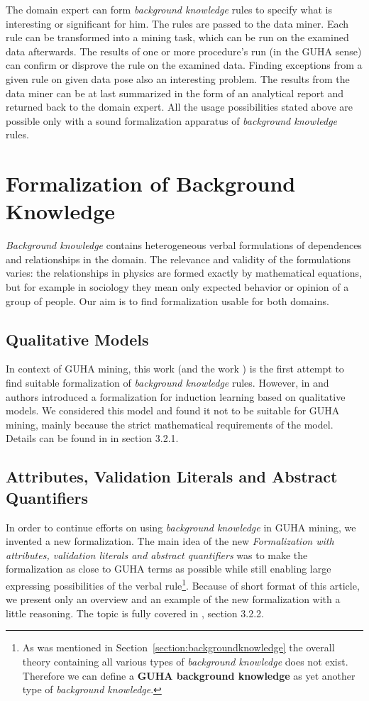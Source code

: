 \documentclass{llncs}
\begin{document}
The domain expert can form \emph{background knowledge} rules to specify what is
interesting or significant for him. The rules are passed to the data miner.
Each rule can be transformed into a mining task, which can be run on the examined
data afterwards. The results of one or more procedure's run (in the GUHA sense)
can confirm or disprove the rule on the examined data. Finding exceptions from a
given rule on given data pose also an interesting problem. The results from
the data miner can be at last summarized in the form of an analytical report and
returned back to the domain expert. All the usage possibilities stated above are
possible only with a sound formalization apparatus of \emph{background knowledge}
rules.

\section{Formalization of Background Knowledge}
\label{section:form}
\emph{Background knowledge} contains heterogeneous verbal formulations of dependences
and relationships in the domain. The relevance and validity of the formulations varies:
the relationships in physics are formed exactly by mathematical equations, but for
example in sociology they mean only expected behavior or opinion of a group of people.
Our aim is to find formalization usable for both domains.

\subsection{Qualitative Models}
\label{section:models}
In context of GUHA mining, this work (and the work \cite{Diplomka}) is the first
attempt to find suitable formalization of \emph{background knowledge} rules.
However, in \cite{Qualitative1} and \cite{Qualitative2} authors introduced
a formalization for induction learning based on qualitative models. 
We considered this model and found it not to be suitable for GUHA mining, mainly
because the strict mathematical requirements of the model. Details can be found
in \cite{Diplomka} in section 3.2.1.

\subsection{Attributes, Validation Literals and Abstract Quantifiers}
\label{section:formalization}
In order to continue efforts on using \emph{background knowledge} in GUHA
mining, we invented a new formalization. The main idea of the new 
\emph{Formalization with attributes, validation literals and abstract quantifiers}
was to make the formalization as close to GUHA terms as possible while still 
enabling large expressing possibilities of the verbal rule\footnote{As was mentioned
in Section~\ref{section:backgroundknowledge} the overall theory containing all 
various types of \emph{background knowledge} does not exist. Therefore we can
define a \textbf{GUHA background knowledge} as yet another type of \emph{background
knowledge}.}. Because of short format of this article, we present only an overview
and an example of the new formalization with a little reasoning. The topic is fully
covered in \cite{Diplomka}, section 3.2.2.
\end{document}
